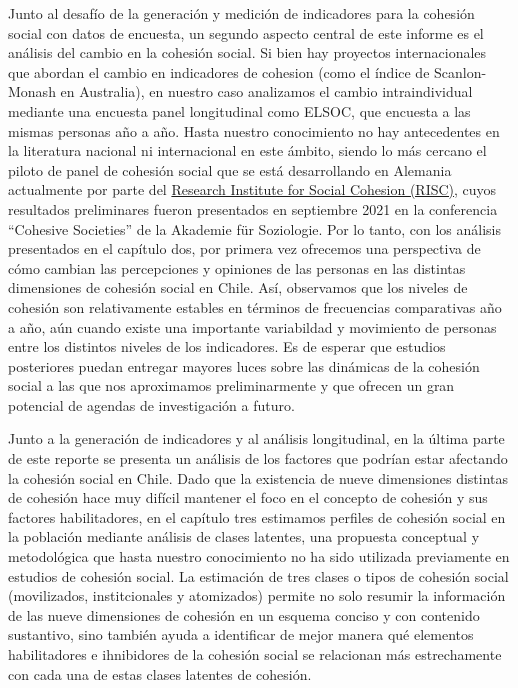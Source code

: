 \documentclass[
  12pt,
]{book}
\begin{document}
Junto al desafío de la generación y medición de indicadores para la cohesión social con datos de encuesta, un segundo aspecto central de este informe es el análisis del cambio en la cohesión social. Si bien hay proyectos internacionales que abordan el cambio en indicadores de cohesion (como el índice de Scanlon-Monash en Australia), en nuestro caso analizamos el cambio intraindividual mediante una encuesta panel longitudinal como ELSOC, que encuesta a las mismas personas año a año. Hasta nuestro conocimiento no hay antecedentes en la literatura nacional ni internacional en este ámbito, siendo lo más cercano el piloto de panel de cohesión social que se está desarrollando en Alemania actualmente por parte del \href{https://www.fgz-risc.de/}{Research Institute for Social Cohesion (RISC)}, cuyos resultados preliminares fueron presentados en septiembre 2021 en la conferencia ``Cohesive Societies'' de la Akademie für Soziologie. Por lo tanto, con los análisis presentados en el capítulo dos, por primera vez ofrecemos una perspectiva de cómo cambian las percepciones y opiniones de las personas en las distintas dimensiones de cohesión social en Chile. Así, observamos que los niveles de cohesión son relativamente estables en términos de frecuencias comparativas año a año, aún cuando existe una importante variabildad y movimiento de personas entre los distintos niveles de los indicadores. Es de esperar que estudios posteriores puedan entregar mayores luces sobre las dinámicas de la cohesión social a las que nos aproximamos preliminarmente y que ofrecen un gran potencial de agendas de investigación a futuro.

Junto a la generación de indicadores y al análisis longitudinal, en la última parte de este reporte se presenta un análisis de los factores que podrían estar afectando la cohesión social en Chile. Dado que la existencia de nueve dimensiones distintas de cohesión hace muy difícil mantener el foco en el concepto de cohesión y sus factores habilitadores, en el capítulo tres estimamos perfiles de cohesión social en la población mediante análisis de clases latentes, una propuesta conceptual y metodológica que hasta nuestro conocimiento no ha sido utilizada previamente en estudios de cohesión social. La estimación de tres clases o tipos de cohesión social (movilizados, institcionales y atomizados) permite no solo resumir la información de las nueve dimensiones de cohesión en un esquema conciso y con contenido sustantivo, sino también ayuda a identificar de mejor manera qué elementos habilitadores e ihnibidores de la cohesión social se relacionan más estrechamente con cada una de estas clases latentes de cohesión.
\end{document}
